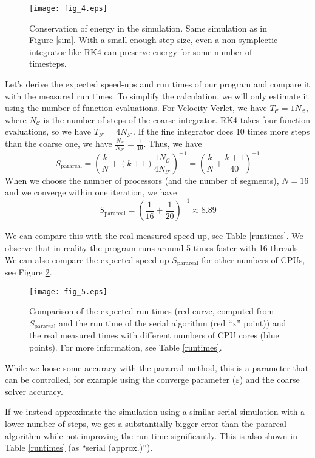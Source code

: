 \documentclass[conference]{IEEEtran}
\begin{document}
\begin{figure}[htbp]
\centerline{\texttt{[image: fig\_4.eps]}}
\caption{Conservation of energy in the simulation. Same simulation as in Figure \ref{sim}. With a small enough step size, even a non-symplectic integrator like RK4 can preserve energy for some number of timesteps.}
\label{energy}
\end{figure}

Let's derive the expected speed-ups and run times of our program and compare it with the measured run times. To simplify the calculation, we will only estimate it using the number of function evaluations. For Velocity Verlet, we have $T_\mathcal{C} = 1N_\mathcal{C}$, where $N_\mathcal{C}$ is the number of steps of the coarse integrator. RK4 takes four function evaluations, so we have $T_\mathcal{F} = 4N_\mathcal{F}$. If the fine integrator does 10 times more steps than the coarse one, we have $\frac{N_\mathcal{C}}{N_\mathcal{F}} = \frac{1}{10}$. Thus, we have
$$
S_\text{parareal} = \left(\frac{k}{N} + (k+1)\frac{1N_\mathcal{C}}{4N_\mathcal{F}}\right)^{-1} = \left(\frac{k}{N} + \frac{k+1}{40}\right)^{-1}
$$
When we choose the number of processors (and the number of segments), $N = 16$ and we converge within one iteration, we have
$$
S_\text{parareal} = \left(\frac{1}{16} + \frac{1}{20}\right)^{-1} \approx 8.89
$$

We can compare this with the real measured speed-up, see Table \ref{runtimes}. We observe that in reality the program runs around 5 times faster with 16 threads. We can also compare the expected speed-up $S_\text{parareal}$ for other numbers of CPUs, see Figure \ref{speeds}.

\begin{figure}[htbp]
\centerline{\texttt{[image: fig\_5.eps]}}
\caption{Comparison of the expected run times (red curve, computed from $S_\text{parareal}$ and the run time of the serial algorithm (red ``x'' point)) and the real measured times with different numbers of CPU cores (blue points). For more information, see Table \ref{runtimes}.}
\label{speeds}
\end{figure}

While we loose some accuracy with the parareal method, this is a parameter that can be controlled, for example using the converge parameter ($\varepsilon$) and the coarse solver accuracy. 

If we instead approximate the simulation using a similar serial simulation with a lower number of steps, we get a substantially bigger error than the parareal algorithm while not improving the run time significantly. This is also shown in Table \ref{runtimes} (as ``serial (approx.)'').
\end{document}
